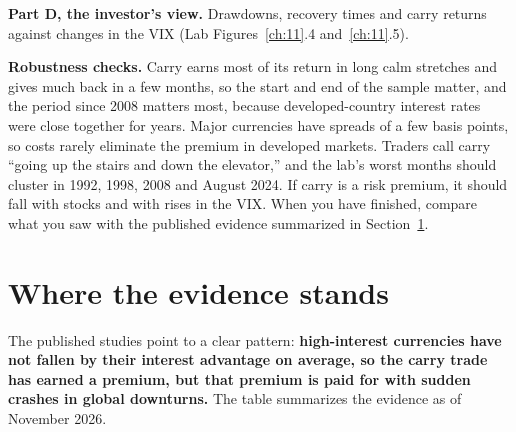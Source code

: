 \textbf{Part D, the investor's view.} Drawdowns, recovery times and carry returns against changes in the VIX (Lab Figures~\ref{ch:11}.4 and~\ref{ch:11}.5).

\label{sec:06-stress}
\textbf{Robustness checks.} Carry earns most of its return in long calm stretches and gives much back in a few months, so the start and end of the sample matter, and the period since 2008 matters most, because developed-country interest rates were close together for years. Major currencies have spreads of a few basis points, so costs rarely eliminate the premium in developed markets. Traders call carry ``going up the stairs and down the elevator,'' and the lab's worst months should cluster in 1992, 1998, 2008 and August 2024. If carry is a risk premium, it should fall with stocks and with rises in the VIX. When you have finished, compare what you saw with the published evidence summarized in Section~\ref{sec:06-verdict}.

\section{Where the evidence stands}
\label{sec:06-verdict}

The published studies point to a clear pattern: \textbf{high-interest currencies have not fallen by their interest advantage on average, so the carry trade has earned a premium, but that premium is paid for with sudden crashes in global downturns.} The table summarizes the evidence as of November 2026.

